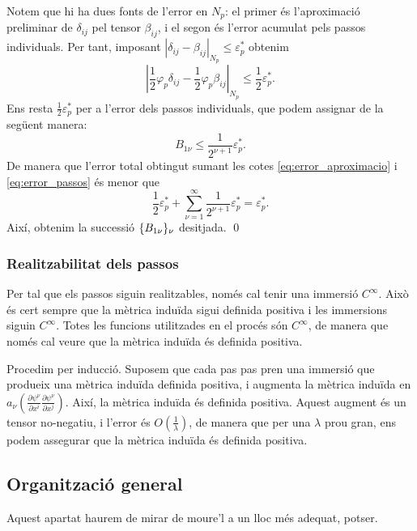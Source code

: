 {Notem que hi ha dues fonts de l'error en $N_p$: el primer és l'aproximació preliminar de $\delta_{ij}$ pel tensor $\beta_{ij}$, i el segon és l'error acumulat pels passos individuals. Per tant, imposant $|\delta_{ij}-\beta_{ij}|_{N_p} \le \varepsilon_p^*$ obtenim 
\begin{equation}\label{eq:error_aproximacio}
    \left|\frac12\varphi_p\delta_{ij}-\frac12\varphi_p\beta_{ij}\right|_{N_p} \le \frac12\varepsilon_p^*.
\end{equation}
Ens resta $\frac12\varepsilon_p^*$
per a l'error dels passos individuals, que podem assignar de la següent manera:
\begin{equation}\label{eq:error_passos}
    B_{1\nu} \le \frac{1}{2^{\nu+1}}\varepsilon_p^*.
\end{equation}
De manera que l'error total obtingut sumant les cotes \eqref{eq:error_aproximacio} i \eqref{eq:error_passos} és menor que
\begin{equation*}
    \frac12\varepsilon_p^* + \sum_{\nu=1}^\infty \frac1{2^{\nu+1}}\varepsilon_p^* = \varepsilon_p^*.
\end{equation*}
Així, obtenim la successió $\{B_{1\nu}\}_{\nu}$ desitjada.
\qed
}
\subsubsection{Realitzabilitat dels passos}
Per tal que els passos siguin realitzables, només cal tenir una immersió $C^\infty$. Això és cert sempre que la mètrica induïda sigui definida positiva i les immersions siguin $C^\infty$. Totes les funcions utilitzades en el procés són $C^\infty$, de manera que només cal veure que la mètrica induïda és definida positiva.

Procedim per inducció. Suposem que cada pas pas pren una immersió que produeix una mètrica induïda definida positiva, i augmenta la mètrica induïda en $a_\nu\left(\frac{\partial\psi^\nu}{\partial x^i}\frac{\partial\psi^\nu}{\partial x^j}\right)$. Així, la mètrica induïda és definida positiva. Aquest augment és un tensor no-negatiu, i l'error és $O\left(\frac1{\lambda}\right)$, de manera que per una $\lambda$ prou gran, ens podem assegurar que la mètrica induïda és definida positiva.

\subsection{Organització general}
{\color{blue} Aquest apartat haurem de mirar de moure'l a un lloc més adequat, potser. }

